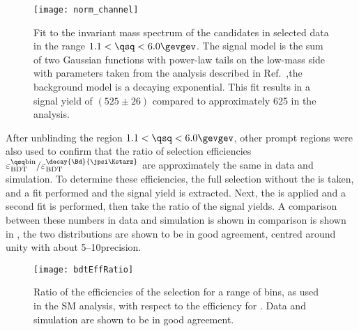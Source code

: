 \begin{figure}
  \begin{center}
    \texttt{[image: norm\_channel]}
    \caption[Fit to the normalization channel, \btokstrmumu in the range $1.1<\qsq<6.0\gevgev$]
    {
      Fit to the invariant mass spectrum of the \Bd candidates in selected data in the range
      $1.1<\qsq<6.0\gevgev$.
      The signal model is the sum of two Gaussian functions with power-law tails on the low-mass
      side with parameters taken from the analysis described in
      Ref.~\protect\cite{LHCb-CONF-2015-002},the background model is a decaying exponential.
      This fit results in a signal yield of $(525\pm26)$ compared to approximately 625 in the \sm
      analysis.
    }
    \label{fig:db:norm}
  \end{center}
\end{figure}

After unblinding the region $1.1<\qsq<6.0\gevgev$, other prompt \qsq regions were also used to
confirm that the ratio of \bdt selection efficiencies
$\varepsilon_\mathrm{BDT}^\mathrm{\qsq bin} / \varepsilon_\mathrm{BDT}^{\decay{\Bd}{\jpsi\Kstarz}}$
are approximately the same in data and simulation.
To determine these efficiencies, the full selection without the \BDT is taken, and a fit performed
and the signal yield is extracted.
Next, the \BDT is applied and a second fit is performed, then take the ratio of the signal
yields.
A comparison between these numbers in data and simulation is shown in comparison is shown in
, the two distributions are shown to be in good agreement, centred around
unity with about 5--10\pc precision.

\begin{figure}
  \begin{center}
    \texttt{[image: bdtEffRatio]}
    \caption{
      Ratio of the efficiencies of the \bdt selection for a range of \qsq bins, as used in the SM
      \btokstrmumu analysis, with respect to the efficiency for \decay{\Bd}{\jpsi\Kstarz}.
      Data and simulation are shown to be in good agreement.
    }
    \label{fig:bdtEffRatio}
  \end{center}
\end{figure}


